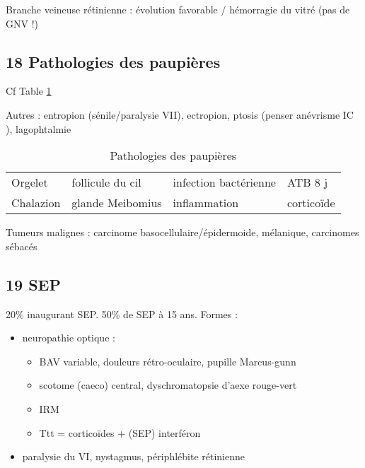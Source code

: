 \documentclass[11pt]{article}
\begin{document}
\begin{table}
\caption{Formes d'OVR}
\centering
{}
\label{org48cfef9}
\end{table}

Branche veineuse rétinienne : évolution favorable / hémorragie du vitré (pas
  de GNV !)
\subsection{18 Pathologies des paupières}
\label{sec:org17e0b53}
Cf Table \ref{tab:org4452f44}

Autres : entropion (sénile/paralysie VII), ectropion, ptosis (penser anévrisme
IC ), lagophtalmie

\begin{table}[htbp]
\caption{\label{tab:org4452f44}Pathologies des paupières}
\centering
\begin{tabular}{llll}
Orgelet & follicule du cil & infection bactérienne & ATB 8 j\\
Chalazion & glande Meibomius & inflammation & corticoïde\\
\end{tabular}
\end{table}
Tumeurs malignes : carcinome basocellulaire/épidermoide, mélanique, carcinomes sébacés
\subsection{19 SEP}
\label{sec:orgc9fffe7}
20\% inaugurant SEP. 50\% de SEP à 15 ans. Formes :
\begin{itemize}
\item neuropathie optique : 
\begin{itemize}
\item BAV variable, douleurs rétro-oculaire, pupille Marcus-gunn
\item scotome (caeco) central, dyschromatopsie d'aexe rouge-vert
\item IRM
\item Ttt = corticoïdes + (SEP) interféron
\end{itemize}
\item paralysie du VI, nystagmus, périphlébite rétinienne
\end{itemize}
\end{document}

